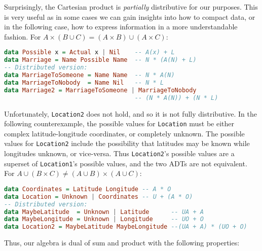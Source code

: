 \documentclass[12pt,a4paper]{article}
\begin{document}
		Surprisingly, the Cartesian product is \textit{partially} distributive for our purposes. This is very useful as in some cases we can gain insights into how to compact data, or in the following case, how to express information in a more understandable fashion. For $ A \times (B \cup C) = (A \times B) \cup (A \times C)$:
	
		\begin{lstlisting}[language=Haskell]
data Possible x = Actual x | Nil    -- A(x) + L
data Marriage = Name Possible Name  -- N * (A(N) + L)
-- Distributed version:
data MarriageToSomeone = Name Name  -- N * A(N)
data MarriageToNobody  = Name Nil   -- N * L
data Marriage2 = MarriageToSomeone | MarriageToNobody 
                                    -- (N * A(N)) + (N * L)
		\end{lstlisting}
	
		Unfortunately, \texttt{Location2} does not hold, and so it is not fully distributive. In the following counterexample, the possible values for \texttt{Location} must be either complex latitude-longitude coordinates, or completely unknown. The possible values for \texttt{Location2} include the possibility that latitudes may be known while longitudes unknown, or vice-versa. Thus \texttt{Location2}'s possible values are a superset of \texttt{Location1}'s possible values, and the two ADTs are not equivalent. For $ A \cup (B \times C) \neq (A \cup B) \times (A \cup C)$:
		
		\begin{lstlisting}[language=Haskell]
data Coordinates = Latitude Longitude -- A * O
data Location = Unknown | Coordinates -- U + (A * O)
-- Distributed version:
data MaybeLatitude  = Unknown | Latitude      -- UA + A
data MaybeLongitude = Unknown | Longitude     -- UO + O
data Location2 = MaybeLatitude MaybeLongitude --(UA + A) * (UO + O)
		\end{lstlisting}
	
		Thus, our algebra is dual of sum and product with the following properties:
		
\end{document}
